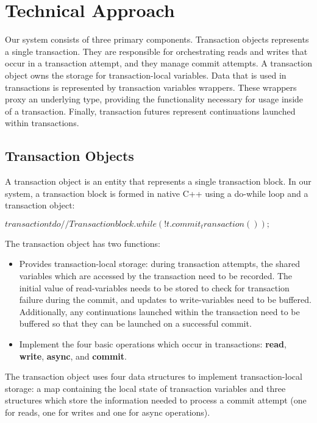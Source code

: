 \documentclass[conference]{IEEEtran}
\begin{document}
\section{Technical Approach}

Our system consists of three primary components. Transaction objects
represents a single transaction. They are responsible for orchestrating reads and
writes that occur in a transaction attempt, and they manage commit
attempts. A transaction object owns the storage for transaction-local
variables. Data that is used in transactions is represented by
transaction variables wrappers. These wrappers proxy an underlying type,
providing the functionality necessary for usage inside of a transaction.
Finally, transaction futures represent continuations launched within
transactions.

\subsection{Transaction Objects}

A transaction object is an entity that represents a single transaction
block. In our system, a transaction block is formed in native C++ using a
do-while loop and a transaction object:

$
transaction t
do {
    // Transaction block.
} while (!t.commit_transaction());
$

The transaction object has two functions:

\begin{itemize}
\item Provides transaction-local storage: during transaction attempts, the
shared variables which are accessed by the transaction need to be recorded. The
initial value of read-variables needs to be stored to check for transaction
failure during the commit, and updates to write-variables need to be buffered.
Additionally, any continuations launched within the transaction need to be
buffered so that they can be launched on a successful commit.
\item Implement the four basic operations which occur in transactions:
\textbf{read}, \textbf{write}, \textbf{async}, and
\textbf{commit}.
\end{itemize}

The transaction object uses four data structures to implement transaction-local
storage: a map containing the local state of transaction variables and three
structures which store the information needed to process a commit attempt (one
for reads, one for writes and one for async operations). 
\end{document}
